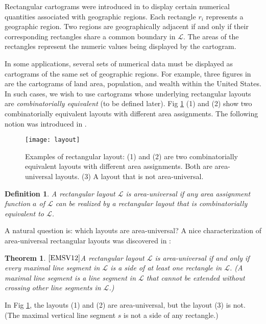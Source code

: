 \documentclass[11pt]{article}
\newcommand{\LL}{\mathcal{L}}
\newtheorem{theorem}[figure]{Theorem}
\newtheorem{definition}[figure]{Definition}
\begin{document}
Rectangular cartograms were introduced in \cite{Ra34} to display
certain numerical quantities associated with geographic regions.
Each rectangle $r_i$ represents a geographic region. Two regions are
geographically adjacent if and only if their corresponding rectangles
share a common boundary in $\LL$. The areas of the rectangles
represent the numeric values being displayed by the cartogram.

In some applications, several sets of numerical data must be displayed
as cartograms of the same set of geographic regions. For example,
three figures in \cite{Ra34} are the cartograms of land area,
population, and wealth within the United States. In such cases, we
wish to use cartograms whose underlying rectangular layouts are
{\em combinatorially equivalent} (to be defined later).
Fig \ref{fig:layout} (1) and (2) show two combinatorially
equivalent layouts with different area assignments.
The following notion was introduced in \cite{EMSV12}.

\begin{figure}[t]
\begin{center}
\texttt{[image: layout]}
  \centering
\caption{Examples of rectangular layout: (1) and (2) are
two combinatorially equivalent layouts with different
area assignments. Both are area-universal layouts.
(3) A layout that is not area-universal.}
\label{fig:layout}
\end{center}
\end{figure}
\begin{definition}
A rectangular layout $\LL$ is {\em area-universal} if any
area assignment function $a$ of $\LL$ can be realized by a
rectangular layout that is {\em combinatorially equivalent} to $\LL$.
\end{definition}



A natural question is: which layouts are area-universal?
A nice characterization of area-universal rectangular layouts was
discovered in \cite{EMSV12}:

\begin{theorem}$\cite{EMSV12}$\label{thm:universal}
A rectangular layout $\LL$ is area-universal if and only
if every maximal line segment in $\LL$ is a side of at
least one rectangle in $\LL$.
(A maximal line segment is a line segment in $\LL$ that cannot
be extended without crossing other line segments in $\LL$.)
\end{theorem}

In Fig \ref{fig:layout}, the layouts (1) and (2) are area-universal,
but the layout (3) is not. (The maximal vertical line segment $s$
is not a side of any rectangle.)
\end{document}
